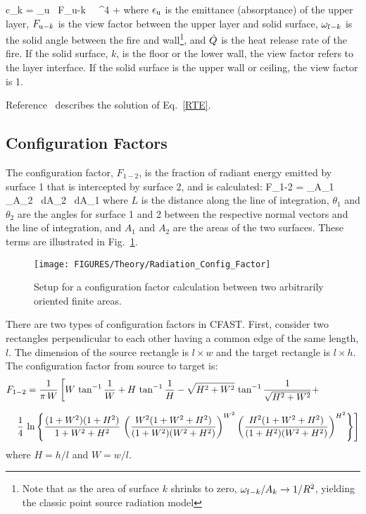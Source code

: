\documentclass[12pt]{book}
\begin{document}
\be
   c_k = \epsilon_{\rm u} \, F_{{\rm u}-k} \, \sigma \, \Tu^4 +    \label{ckeq}
\ee
where $\epsilon_{\rm u}$ is the emittance (absorptance) of the upper layer, $F_{{\rm u}-k}$ is the view factor between the upper layer and solid surface, $\omega_{{\rm f}-k}$ is the solid angle between the fire and wall\footnote{Note that as the area of surface $k$ shrinks to zero, $\omega_{{\rm f}-k}/A_k \to 1/R^2$, yielding the classic point source radiation model}, and $\dot{Q}$ is the heat release rate of the fire. If the solid surface, $k$, is the floor or the lower wall, the view factor refers to the layer interface. If the solid surface is the upper wall or ceiling, the view factor is 1.

Reference~\cite{Forney_radiation} describes the solution of Eq.~\ref{RTE}.


\subsection{Configuration Factors}

The configuration factor, $F_{1-2}$, is the fraction of radiant energy emitted by surface 1 that is intercepted by  surface 2, and is calculated:
\be
   F_{1-2} =  \int_{A_1} \int_{A_2}  \, dA_2 \, dA_1 \label{eq:config_factor}
\ee
where $L$ is the distance along the line of integration,  $\theta_1$ and $\theta_2$ are the angles for surface 1 and 2 between the respective normal vectors and the line of integration, and $A_1$ and $A_2$ are the areas of the two surfaces.  These terms are illustrated in Fig.~\ref{fig:Rad_Config_Factor}.
\begin{figure}
\begin{center}
\texttt{[image: FIGURES/Theory/Radiation\_Config\_Factor]}\\
\end{center}
\caption{Setup for a configuration factor calculation between two arbitrarily oriented finite areas.}
 \label{fig:Rad_Config_Factor}
\end{figure}
There are two types of configuration factors in CFAST. First, consider two rectangles perpendicular to each other having a common edge of the same length, $l$. The dimension of the source rectangle is $l \times w$ and the target rectangle is $l \times h$. The configuration factor from source to target is:
\begin{eqnarray}
\lefteqn{F_{1-2} = \frac{1}{\pi \, W} \left[ W \, \tan^{-1} \frac{1}{W} + H \, \tan^{-1} \frac{1}{H} - \sqrt{H^2+W^2} \, \tan^{-1} \frac{1}{\sqrt{H^2+W^2}} + \right.}  \nonumber \\[.1in]
& &   \left. \frac{1}{4} \, \ln \left\{ \frac{(1+W^2)(1+H^2)}{1+W^2+H^2} \, \left( \frac{W^2(1+W^2+H^2)}{(1+W^2)(W^2+H^2)} \right)^{W^2} \left( \frac{H^2(1+W^2+H^2)}{(1+H^2)(W^2+H^2)} \right)^{H^2} \right\} \right]
\end{eqnarray}
where $H=h/l$ and $W=w/l$.
\end{document}
